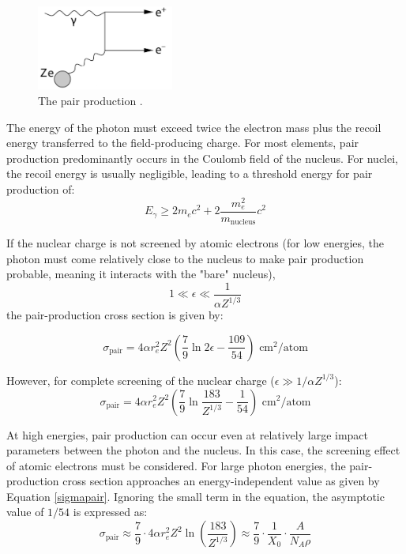 \begin{figure}[!h]
    \centering
    \includegraphics[width=0.4\textwidth]{figures/png/Screenshot_20240812_204755.png}
    \caption[The pair production.]{The pair production \cite{kola}.}
    \label{fig:pprod}
\end{figure}

The energy of the photon must exceed twice the electron 
mass plus the recoil energy transferred to the field-producing 
charge. For most elements, pair production predominantly 
occurs in the Coulomb field of the nucleus. For nuclei, 
the recoil energy is usually negligible, leading to a 
threshold energy for pair production of:
\begin{equation}
    E_{\gamma} \geq 2m_e c^2 + 2 \frac{m_e^2}{m_{\text{nucleus}}} c^2
\end{equation}

If the nuclear charge is not screened by atomic electrons 
(for low energies, the photon must come relatively close to 
the nucleus to make pair production probable, meaning it 
interacts with the "bare" nucleus),
\begin{equation}
    1 \ll \epsilon \ll \frac{1}{\alpha Z^{1/3}}
\end{equation}
the pair-production cross section is given by:

\begin{equation}
    \sigma_{\text{pair}} = 4 \alpha r_e^2 Z^2 \left(\frac{7}{9} \ln 2 \epsilon - \frac{109}{54}\right) \text{ cm}^2/\text{atom}
\end{equation}

However, for complete screening of the nuclear charge ($\epsilon \gg 1/\alpha Z^{1/3}$):
\begin{equation}\label{sigmapair}
    \sigma_{\text{pair}} = 4 \alpha r_e^2 Z^2 \left(\frac{7}{9} \ln \frac{183}{Z^{1/3}} - \frac{1}{54}\right) \text{ cm}^2/\text{atom}
\end{equation}

At high energies, pair production can occur even 
at relatively large impact parameters between the 
photon and the nucleus. In this case, the screening 
effect of atomic electrons must be considered. For 
large photon energies, the pair-production cross 
section approaches an energy-independent value as given by
 Equation \ref{sigmapair}. Ignoring the small term in the equation, 
 the asymptotic value of $1/54$ is expressed as:
\begin{equation}
    \sigma_{\text{pair}} \approx \frac{7}{9} \cdot 4 \alpha r_e^2 Z^2 \ln\left(\frac{183}{Z^{1/3}}\right) \approx \frac{7}{9} \cdot \frac{1}{X_0} \cdot \frac{A}{N_A \rho}
    \label{eq:paircross_radiationlength}
\end{equation}

